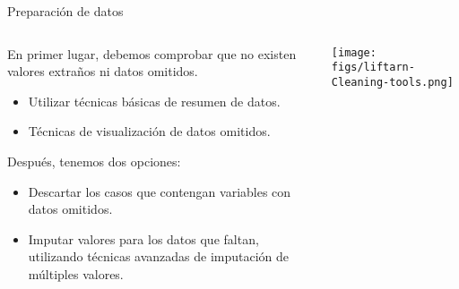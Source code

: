 
\begin{frame}{Preparación de datos}
 \begin{columns}[T]
    \begin{column}{.75\textwidth}
     \begin{wideitemize}
      \item En primer lugar, debemos comprobar que no existen valores extraños
      ni datos omitidos.
      
      \begin{itemize}
       \item Utilizar técnicas básicas de resumen de datos.
       \item Técnicas de visualización de datos omitidos.
      \end{itemize}
      
      \item Después, tenemos dos opciones:
      \begin{itemize}
       \item Descartar los casos que contengan variables con datos omitidos.
       \item Imputar valores para los datos que faltan, utilizando técnicas
       avanzadas de imputación de múltiples valores.
      \end{itemize}

    \end{wideitemize}
    
    \end{column}
    \begin{column}{.25\textwidth}
    \vspace*{1cm}
    \texttt{[image: figs/liftarn-Cleaning-tools.png]}
    \end{column}
  \end{columns}

\end{frame}


